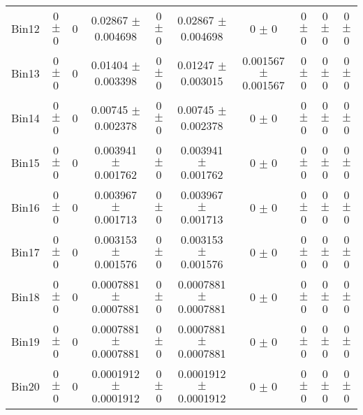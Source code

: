 \begin{tabular}{@{\extracolsep{4pt}}lccccccccc@{}}
     Bin12 & 0 $\pm$ 0 & 0 & 0.02867 $\pm$ 0.004698 & 0 $\pm$ 0 & 0.02867 $\pm$ 0.004698 & 0 $\pm$ 0 & 0 $\pm$ 0 & 0 $\pm$ 0 & 0 $\pm$ 0 \\ 
     Bin13 & 0 $\pm$ 0 & 0 & 0.01404 $\pm$ 0.003398 & 0 $\pm$ 0 & 0.01247 $\pm$ 0.003015 & 0.001567 $\pm$ 0.001567 & 0 $\pm$ 0 & 0 $\pm$ 0 & 0 $\pm$ 0 \\ 
     Bin14 & 0 $\pm$ 0 & 0 & 0.00745 $\pm$ 0.002378 & 0 $\pm$ 0 & 0.00745 $\pm$ 0.002378 & 0 $\pm$ 0 & 0 $\pm$ 0 & 0 $\pm$ 0 & 0 $\pm$ 0 \\ 
     Bin15 & 0 $\pm$ 0 & 0 & 0.003941 $\pm$ 0.001762 & 0 $\pm$ 0 & 0.003941 $\pm$ 0.001762 & 0 $\pm$ 0 & 0 $\pm$ 0 & 0 $\pm$ 0 & 0 $\pm$ 0 \\ 
     Bin16 & 0 $\pm$ 0 & 0 & 0.003967 $\pm$ 0.001713 & 0 $\pm$ 0 & 0.003967 $\pm$ 0.001713 & 0 $\pm$ 0 & 0 $\pm$ 0 & 0 $\pm$ 0 & 0 $\pm$ 0 \\ 
     Bin17 & 0 $\pm$ 0 & 0 & 0.003153 $\pm$ 0.001576 & 0 $\pm$ 0 & 0.003153 $\pm$ 0.001576 & 0 $\pm$ 0 & 0 $\pm$ 0 & 0 $\pm$ 0 & 0 $\pm$ 0 \\ 
     Bin18 & 0 $\pm$ 0 & 0 & 0.0007881 $\pm$ 0.0007881 & 0 $\pm$ 0 & 0.0007881 $\pm$ 0.0007881 & 0 $\pm$ 0 & 0 $\pm$ 0 & 0 $\pm$ 0 & 0 $\pm$ 0 \\ 
     Bin19 & 0 $\pm$ 0 & 0 & 0.0007881 $\pm$ 0.0007881 & 0 $\pm$ 0 & 0.0007881 $\pm$ 0.0007881 & 0 $\pm$ 0 & 0 $\pm$ 0 & 0 $\pm$ 0 & 0 $\pm$ 0 \\ 
     Bin20 & 0 $\pm$ 0 & 0 & 0.0001912 $\pm$ 0.0001912 & 0 $\pm$ 0 & 0.0001912 $\pm$ 0.0001912 & 0 $\pm$ 0 & 0 $\pm$ 0 & 0 $\pm$ 0 & 0 $\pm$ 0 \\ 
\hline\hline
  \end{tabular}
